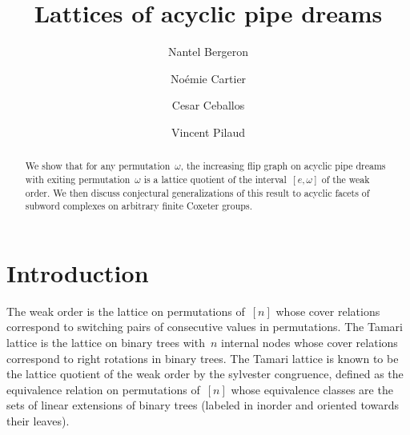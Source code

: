 \documentclass[reqno]{amsart}
\title{Lattices of acyclic pipe dreams}
\author[N.~Bergeron]{Nantel Bergeron}
\author[N.~Cartier]{No\'emie Cartier}
\author[C.~Ceballos]{Cesar Ceballos}
\author[V.~Pilaud]{Vincent Pilaud}
\theoremstyle{definition}
\begin{document}
\begin{abstract}
We show that for any permutation~$\omega$, the increasing flip graph on acyclic pipe dreams with exiting permutation~$\omega$ is a lattice quotient of the interval~$[e,\omega]$ of the weak order.
We then discuss conjectural generalizations of this result to acyclic facets of subword complexes on arbitrary finite Coxeter groups.
\end{abstract}

\vspace*{-1cm}

\maketitle

\tableofcontents

\vspace*{-.5cm}


\section{Introduction}
\label{sec:introduction}

The weak order is the lattice on permutations of~$[n]$ whose cover relations correspond to switching pairs of consecutive values in permutations.
The Tamari lattice is the lattice on binary trees with~$n$ internal nodes whose cover relations correspond to right rotations in binary trees.
The Tamari lattice is known to be the lattice quotient of the weak order by the sylvester congruence, defined as the equivalence relation on permutations of~$[n]$ whose equivalence classes are the sets of linear extensions of binary trees (labeled in inorder and oriented towards their leaves).
\end{document}
